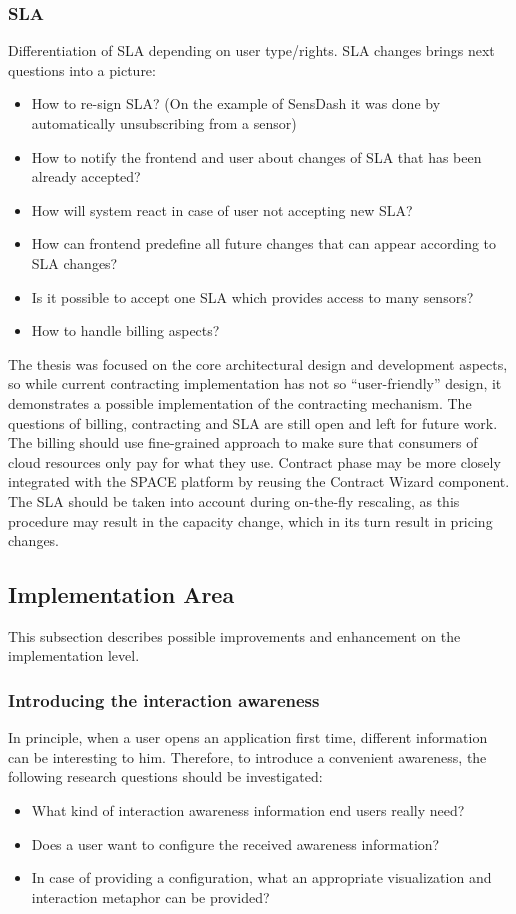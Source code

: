 \subsubsection {SLA}
Differentiation of SLA depending on user type/rights. SLA changes brings next questions into a picture: 
  \begin{itemize}
  \item How to re-sign SLA? (On the example of SensDash it was done by automatically unsubscribing from a sensor)
  \item How to notify the frontend and user about changes of SLA that has been already accepted?
  \item How will system react in case of user not accepting new SLA?
  \item How can frontend predefine all future changes that can appear according to SLA changes?
  \item Is it possible to accept one SLA which provides access to many sensors?
  \item How to handle billing aspects?
  \end{itemize}

The thesis was focused on the core architectural design and development aspects, so while current contracting implementation has not so ``user-friendly'' design, it demonstrates a possible implementation of the contracting mechanism. The questions of billing, contracting and SLA are still open and left for future work. The billing should use fine-grained approach to make sure that consumers of cloud resources only pay for what they use. Contract phase may be more closely integrated with the SPACE platform by reusing the Contract Wizard component. The SLA should be taken into account during on-the-fly rescaling, as this procedure may result in the capacity change, which in its turn result in pricing changes. 

\subsection{Implementation Area}
This subsection describes possible improvements and enhancement on the implementation level.

\subsubsection {Introducing the interaction awareness}
In principle, when a user opens an application first time, different information can be interesting to him. Therefore, to introduce a convenient awareness, the following research questions should be investigated:
 \begin{itemize}
\item What kind of interaction awareness information end users really need?
\item Does a user want to configure the received awareness information?
\item In case of providing a configuration, what an appropriate visualization and interaction metaphor can be provided? 
\end{itemize}

